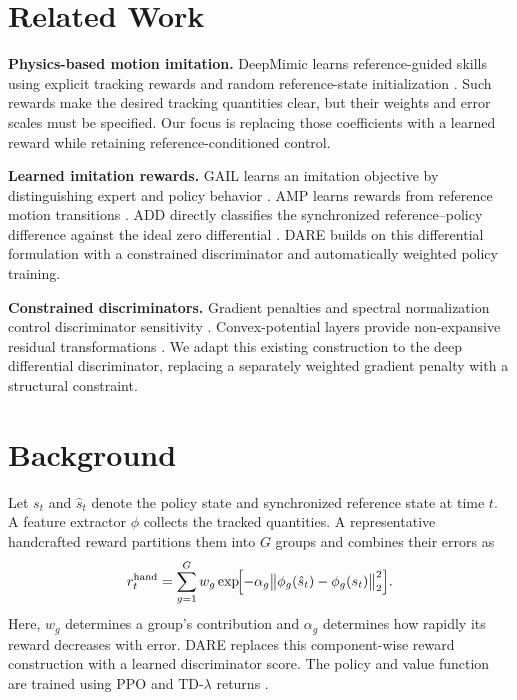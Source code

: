 \documentclass[letterpaper,10pt,conference]{ieeeconf}
\begin{document}
\section{Related Work}
\textbf{Physics-based motion imitation.}
DeepMimic learns reference-guided skills using explicit tracking rewards
and random reference-state initialization \cite{peng2018deepmimic}.
Such rewards make the desired tracking quantities clear, but their weights
and error scales must be specified. Our focus is replacing those
coefficients with a learned reward while retaining reference-conditioned
control.

\textbf{Learned imitation rewards.}
GAIL learns an imitation objective by distinguishing expert and policy
behavior \cite{ho2016gail}. AMP learns rewards from reference motion
transitions \cite{peng2021amp}. ADD directly classifies the synchronized
reference--policy difference against the ideal zero differential
\cite{zhang2025add}. DARE builds on this differential formulation with a
constrained discriminator and automatically weighted policy training.

\textbf{Constrained discriminators.}
Gradient penalties and spectral normalization control discriminator
sensitivity \cite{gulrajani2017improved,miyato2018spectral}. Convex-potential
layers provide non-expansive residual transformations
\cite{meunier2022cpl}. We adapt this existing construction to the deep
differential discriminator, replacing a separately weighted gradient
penalty with a structural constraint.

\section{Background}
Let $s_t$ and $\hat s_t$ denote the policy state and synchronized reference
state at time $t$. A feature extractor $\phi$ collects the tracked
quantities. A representative handcrafted reward partitions them into $G$
groups and combines their errors as
\begin{equation}
r_t^{\mathrm{hand}}=\sum_{g=1}^{G}w_g
\exp\!\Bigl[-\alpha_g
\bigl\|\phi_g(\hat s_t)-\phi_g(s_t)\bigr\|_2^2\Bigr].
\label{eq:hand}
\end{equation}
Here, $w_g$ determines a group's contribution and $\alpha_g$ determines
how rapidly its reward decreases with error. DARE replaces this
component-wise reward construction with a learned discriminator score.
The policy and value function are trained using PPO and TD-$\lambda$
returns \cite{schulman2017ppo,schulman2016gae}.
\end{document}
